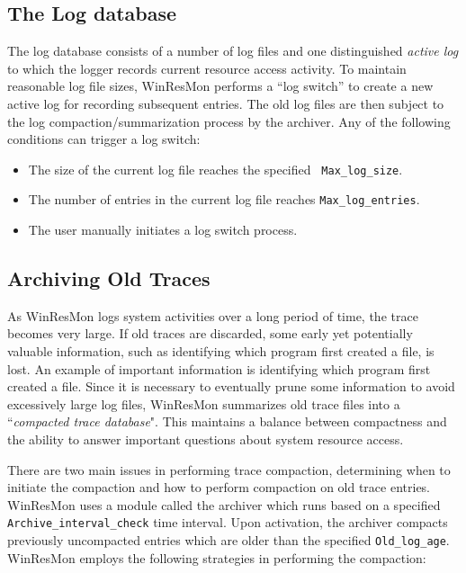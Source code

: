 \subsection{The Log database}

The log database consists of a number of log files and one
distinguished {\it active log} to which the logger 
records current resource access activity.
To maintain reasonable log file sizes, WinResMon performs a ``log switch'' 
to create a new active log for recording subsequent entries.  The old
log files are then subject to the log compaction/summarization process by the
archiver.  Any of the following conditions can trigger a log switch: \\

\begin{itemize}
\item The size of the current log file reaches the specified {\tt
Max\_log\_size}. \\
\item The number of entries in the current log file reaches
{\tt Max\_log\_entries}. \\
\item The user manually initiates a log switch process.
\end{itemize}


\subsection{Archiving Old Traces}

As WinResMon logs system activities over a long period of time, the trace
becomes very large. If old traces are discarded, some early yet potentially valuable information,
such as identifying which program first created a file, is lost. An example of important information is
identifying which program first created a file.  Since it is necessary
to eventually prune some information to avoid excessively large log files,
WinResMon summarizes old trace files into a ``{\em compacted trace database}".
This maintains a balance between compactness and the ability to answer
important questions about system resource access.

There are two main issues in performing trace compaction, determining when to
initiate the compaction and how to perform compaction on old trace entries.
WinResMon uses a module called the archiver which runs based on a specified 
{\tt Archive\_interval\_check} time interval.  Upon activation, the archiver
compacts previously uncompacted entries which are older than the specified 
{\tt Old\_log\_age}.  
WinResMon employs the following strategies in performing the compaction:

